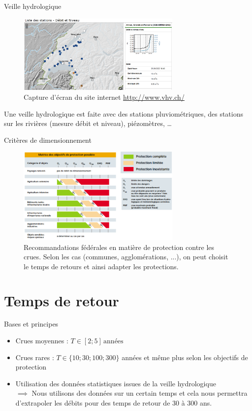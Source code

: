 \documentclass{beamer}
\begin{document}
\begin{frame}{Veille hydrologique}
    \begin{figure}
        \centering
        \includegraphics[width=8cm]{veilleHydrologique_VAUD.png}
        \caption{Capture d'écran du site internet \href{http://www.vhv.ch/}{http://www.vhv.ch/}}
    \end{figure}
    Une veille hydrologique est faite avec des stations pluviométriques, des stations sur les rivières (mesure débit et niveau), piézomètres, \dots
\end{frame}

\begin{frame}{Critères de dimensionnement}
    \begin{figure}
        \centering
        \includegraphics[width=8cm]{matriceObjectifsDimensionnement.png}
        \caption{Recommandations fédérales en matière de protection contre les crues. Selon les cas (communes, agglomérations, ...), on peut choisit le temps de retours et ainsi adapter les protections.}
    \end{figure}
\end{frame}

\section{Temps de retour}
\begin{frame}{Bases et principes}
    \begin{itemize}[label=$\rhd$]
        \item Crues moyennes : $T \in [2;5] \, \text{années}$
        \item Crues rares : $T \in \{10;30;100;300\}$ années et même plus selon les objectifs de protection
        \item Utilisation des données statistiques issues de la veille hydrologique \\
        $\implies$ Nous utilisons des données sur un certain temps et cela nous permettra d'extrapoler les débits pour des temps de retour de 30 à 300 ans.
    \end{itemize}
\end{frame}
\end{document}
